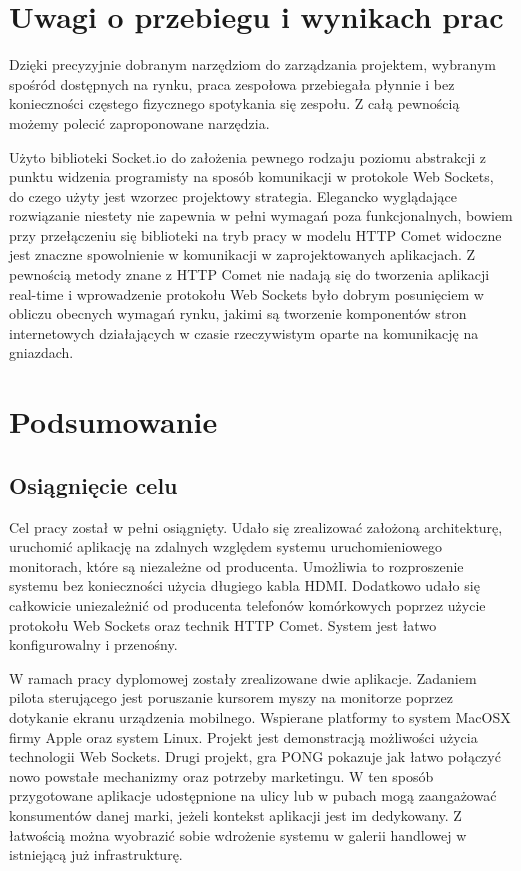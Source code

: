 \newpage
\section{Uwagi o przebiegu i wynikach prac}

Dzięki precyzyjnie dobranym narzędziom do zarządzania projektem, wybranym spośród dostępnych na rynku, praca zespołowa przebiegała płynnie i bez konieczności częstego fizycznego spotykania się zespołu. Z całą pewnością możemy polecić zaproponowane narzędzia. 

Użyto biblioteki Socket.io do założenia pewnego rodzaju poziomu abstrakcji z punktu widzenia programisty na sposób komunikacji w protokole Web Sockets, do czego użyty jest wzorzec projektowy strategia. Elegancko wyglądające rozwiązanie niestety nie zapewnia w pełni wymagań poza funkcjonalnych, bowiem przy przełączeniu się biblioteki na tryb pracy w modelu HTTP Comet widoczne jest znaczne spowolnienie w komunikacji w zaprojektowanych aplikacjach. Z pewnością metody znane z HTTP Comet nie nadają się do tworzenia aplikacji real-time i wprowadzenie protokołu Web Sockets było dobrym posunięciem w obliczu obecnych wymagań rynku, jakimi są tworzenie komponentów stron internetowych działających w czasie rzeczywistym oparte na komunikację na gniazdach.


\section{Podsumowanie}

\subsection{Osiągnięcie celu}

Cel pracy został w pełni osiągnięty. Udało się zrealizować założoną architekturę, uruchomić aplikację na zdalnych względem systemu uruchomieniowego monitorach, które są niezależne od producenta. Umożliwia to rozproszenie systemu bez konieczności użycia długiego kabla HDMI. Dodatkowo udało się całkowicie uniezależnić od producenta telefonów komórkowych poprzez użycie protokołu Web Sockets oraz technik HTTP Comet. System jest łatwo konfigurowalny i przenośny.

W ramach pracy dyplomowej zostały zrealizowane dwie aplikacje. Zadaniem pilota sterującego jest poruszanie kursorem myszy na monitorze poprzez dotykanie ekranu urządzenia mobilnego. Wspierane platformy to system MacOSX firmy Apple oraz system Linux. Projekt jest demonstracją możliwości użycia technologii Web Sockets. Drugi projekt, gra PONG pokazuje jak łatwo połączyć nowo powstałe mechanizmy oraz potrzeby marketingu. W ten sposób przygotowane aplikacje udostępnione na ulicy lub w pubach mogą zaangażować konsumentów danej marki, jeżeli kontekst aplikacji jest im dedykowany. Z łatwością można wyobrazić sobie wdrożenie systemu w galerii handlowej w istniejącą już infrastrukturę.

